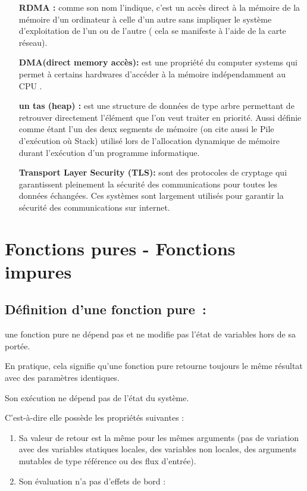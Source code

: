 \documentclass[12pt,titlepage]{article}
\begin{document}
\begin{itemize}
\item[\textbf{ RDMA : }] comme son nom l’indique, c’est un accès direct à la mémoire de la mémoire d'un ordinateur à celle d'un autre sans impliquer le système d'exploitation de l'un ou de l'autre ( cela se manifeste à l’aide de la carte réseau).


\item[\textbf{ DMA(direct memory accès):}] est une propriété du computer systems qui permet à certains hardwares d’accéder à la mémoire indépendamment au CPU .

\item[\textbf{ un tas (heap) :}] est une structure de données de type arbre permettant de retrouver directement l'élément que l'on veut traiter en priorité. Aussi définie comme étant l’un des deux segments de mémoire (on cite aussi le Pile d’exécution où Stack) utilisé lors de l'allocation dynamique de mémoire durant l'exécution d'un programme informatique.

\item[\textbf{ Transport Layer Security (TLS):}] sont des protocoles de cryptage qui garantissent pleinement la sécurité des communications pour toutes les données échangées. Ces systèmes sont largement utilisés pour garantir la sécurité des communications sur internet. 


\end{itemize}

\section{Fonctions pures - Fonctions impures}


\subsection{Définition d’une fonction pure :}

une fonction pure ne dépend pas et ne modifie pas l'état de variables hors de sa portée.

En pratique, cela signifie qu'une fonction pure retourne toujours le même résultat avec des paramètres identiques.

Son exécution ne dépend pas de l’état du système.

C'est-à-dire elle possède  les propriétés suivantes :

\begin{enumerate}
	\item Sa valeur de retour est la même pour les mêmes arguments (pas de variation avec des variables statiques locales, des variables non locales, des arguments mutables de type référence ou des flux d'entrée).

	\item Son évaluation n'a pas d'effets de bord :
\end{enumerate}
\end{document}
